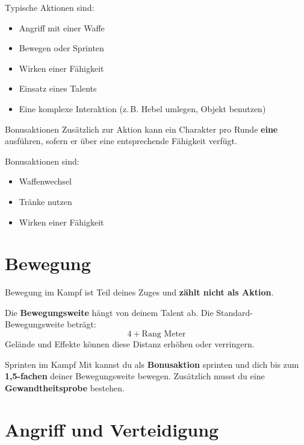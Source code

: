 Typische Aktionen sind:
\begin{itemize}
	\item Angriff mit einer Waffe
	\item Bewegen oder Sprinten
	\item Wirken einer Fähigkeit
	\item Einsatz eines Talents
	\item Eine komplexe Interaktion (z.\,B. Hebel umlegen, Objekt benutzen)
\end{itemize}

\begin{rulebox}{Bonusaktionen}
	Zusätzlich zur Aktion kann ein Charakter pro Runde \textbf{eine }
	ausführen, sofern er über eine entsprechende Fähigkeit verfügt.
\end{rulebox}

Bonusaktionen sind:
\begin{itemize}
	\item Waffenwechsel
	\item Tränke nutzen
	\item Wirken einer Fähigkeit
\end{itemize}

\section{Bewegung}

\begin{rulebox}{Bewegung im Kampf}
	 ist Teil deines Zuges und \textbf{zählt nicht als Aktion}.
\end{rulebox}

Die \textbf{Bewegungsweite} hängt von deinem Talent \textbf{} ab.
Die Standard-Bewegungsweite beträgt:
\[
4 + \text{Rang} \text{ Meter}
\]
Gelände und Effekte können diese Distanz erhöhen oder verringern.

\begin{rulebox}{Sprinten im Kampf}
	Mit  kannst du als \textbf{Bonusaktion} sprinten und dich
	bis zum \textbf{1,5-fachen} deiner Bewegungsweite bewegen. Zusätzlich musst du eine
	\textbf{Gewandtheitsprobe} bestehen.
\end{rulebox}


\section{Angriff und Verteidigung}

